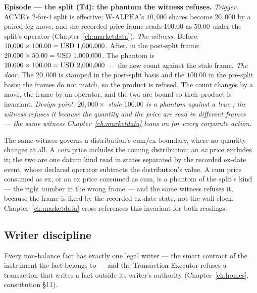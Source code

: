 \medskip\noindent\textbf{Episode --- the split (T4): the phantom the witness
refuses.}
\emph{Trigger.} ACME's $2$-for-$1$ split is effective; W-ALPHA's $10{,}000$
shares become $20{,}000$ by a paired-leg move, and the recorded price frame reads
$100.00$ as $50.00$ under the split's operator (Chapter~\ref{ch:marketdata}).
\emph{The witness.} Before: $10{,}000\times 100.00 = \mbox{USD~1{,}000{,}000}$. After,
in the post-split frame: $20{,}000\times 50.00 = \mbox{USD~1{,}000{,}000}$. The phantom
is $20{,}000\times 100.00 = \mbox{USD~2{,}000{,}000}$ --- the new count against the
stale frame. \emph{The door.} The $20{,}000$ is stamped in the post-split basis
and the $100.00$ in the pre-split basis; the frames do not match, so the product
is refused. The count changes by a move, the frame by an operator, and the two
are bound so their product is invariant.
\emph{Design point.} \emph{$20{,}000\times$ stale $100.00$ is a phantom
 against a true ; the witness refuses it
because the quantity and the price are read in different frames --- the same
witness Chapter~\ref{ch:marketdata} leans on for every corporate action.}

The same witness governs a distribution's cum/ex boundary, where no quantity
changes at all. A \emph{cum} price includes the coming distribution; an \emph{ex}
price excludes it; the two are one datum kind read in states separated by the
recorded ex-date event, whose declared operator subtracts the distribution's
value. A cum price consumed as ex, or an ex price consumed as cum, is a phantom of
the split's kind --- the right number in the wrong frame --- and the same witness
refuses it, because the frame is fixed by the recorded ex-date state, not the wall
clock. Chapter~\ref{ch:marketdata} cross-references this invariant for both
readings.

\subsection{Writer discipline}

\begin{invariant}\label{inv:writer}
Every non-balance fact has exactly one legal writer --- the smart contract of the
instrument the fact belongs to --- and the Transaction Executor refuses a
transaction that writes a fact outside its writer's authority
(Chapter~\ref{ch:homes}, constitution \S 11).
\end{invariant}


